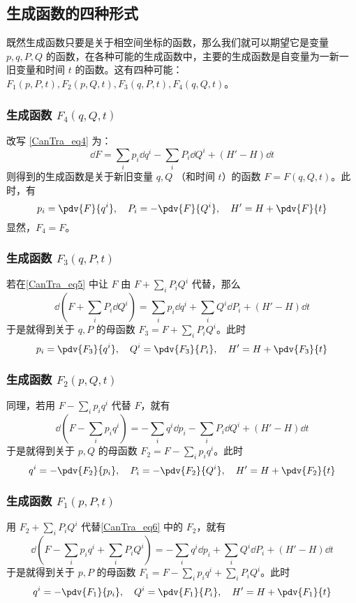 \subsection{生成函数的四种形式}
既然生成函数只要是关于相空间坐标的函数，那么我们就可以期望它是变量 $p,q,P,Q$ 的函数，在各种可能的生成函数中，主要的生成函数是自变量为一新一旧变量和时间 $t$ 的函数。这有四种可能：$F_1(p,P,t),F_2(p,Q,t),F_3(q,P,t),F_4(q,Q,t)$。
\subsubsection{生成函数 $F_4(q,Q,t)$}
改写 \autoref{CanTra_eq4} 为：
\begin{equation}\label{CanTra_eq5}
\dd F=\sum_ip_i\dd q^i-\sum_iP_i\dd Q^i+(H'-H)\dd t
\end{equation}
则得到的生成函数是关于新旧变量 $q,Q$ （和时间 $t$）的函数 $F=F(q,Q,t)$。此时，有
\begin{equation}
p_i=\pdv{F}{q^i},\quad P_i=-\pdv{F}{Q^i},\quad H'=H+\pdv{F}{t}
\end{equation}
显然，$F_4=F$。
\subsubsection{生成函数 $F_3(q,P,t)$}
若在\autoref{CanTra_eq5} 中让 $F$ 由 $F+\sum_iP_i Q^i$ 代替，那么
\begin{equation}
\dd (F+\sum_iP_i\dd Q^i)=\sum_i p_i\dd q^i+\sum_i Q^i\dd P_i+(H'-H)\dd t
\end{equation}
于是就得到关于 $q,P$ 的母函数 $F_3=F+\sum_iP_i Q^i$。此时
\begin{equation}
p_i=\pdv{F_3}{q^i},\quad Q^i=\pdv{F_3}{P_i},\quad H'=H+\pdv{F_3}{t}
\end{equation}

\subsubsection{生成函数 $F_2(p,Q,t)$}
同理，若用 $F-\sum_ip_iq^i$ 代替 $F$，就有
\begin{equation}\label{CanTra_eq6}
\dd (F-\sum_ip_i q^i)=-\sum_i q^i\dd p_i-\sum_i P_i\dd Q^i+(H'-H)\dd t
\end{equation}
于是就得到关于 $p,Q$ 的母函数 $F_2=F-\sum_ip_i q^i$。此时
\begin{equation}
q^i=-\pdv{F_2}{p_i},\quad P_i=-\pdv{F_2}{Q^i},\quad H'=H+\pdv{F_2}{t}
\end{equation}
\subsubsection{生成函数 $F_1(p,P,t)$}
用 $F_2+\sum_iP_iQ^i$ 代替\autoref{CanTra_eq6} 中的 $F_2$，就有
\begin{equation}
\dd(F-\sum_ip_i q^i+\sum_i P_i Q^i)=-\sum_i q^i\dd p_i+\sum_i Q^i\dd P_i+(H'-H)\dd t
\end{equation}
于是就得到关于 $p,P$ 的母函数 $F_1=F-\sum_ip_i q^i+\sum_i P_i Q^i$。此时
\begin{equation}
q^i=-\pdv{F_1}{p_i},\quad Q^i=\pdv{F_1}{P_i},\quad H'=H+\pdv{F_1}{t}
\end{equation}

